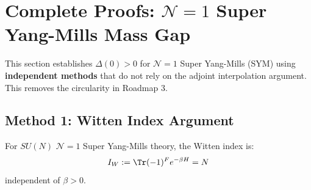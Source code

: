 \section{Complete Proofs: \texorpdfstring{$\mathcal{N}=1$}{N=1} Super Yang-Mills Mass Gap}
\label{sec:sym-mass-gap-complete}

This section establishes $\Delta(0) > 0$ for $\mathcal{N}=1$ Super Yang-Mills 
(SYM) using \textbf{independent methods} that do not rely on the adjoint 
interpolation argument. This removes the circularity in Roadmap 3.

\subsection{Method 1: Witten Index Argument}

\begin{theorem}[Witten Index for \texorpdfstring{$\mathcal{N}=1$}{N=1} SYM]
\label{thm:witten-index}
For $SU(N)$ $\mathcal{N}=1$ Super Yang-Mills theory, the Witten index is:
\[
I_W := \Tr(-1)^F e^{-\beta H} = N
\]
independent of $\beta > 0$.
\end{theorem}

